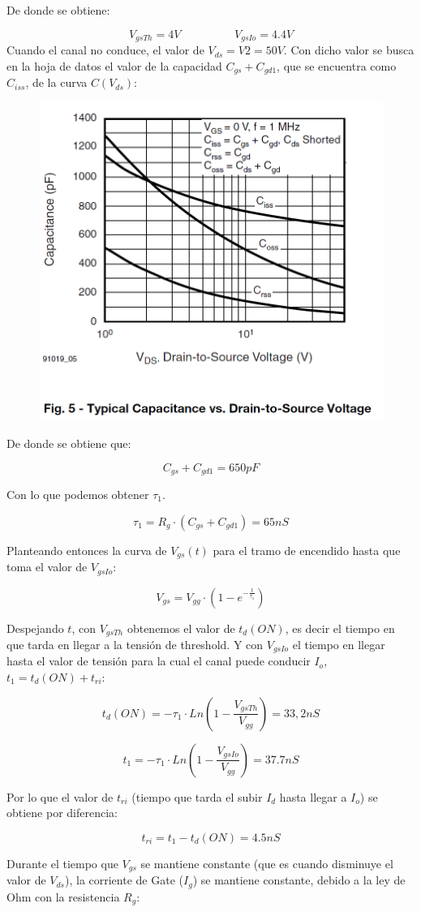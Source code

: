 \documentclass[e4_tp1_main.tex]{subfiles}
\begin{document}
De donde se obtiene:

\[
V_{gsTh} = 4V \hspace{2cm} V_{gsIo} = 4.4V
\]
\newpage
Cuando el canal no conduce, el valor de $V_{ds} = V2 = 50V$. Con dicho valor se busca en la hoja de datos el valor de la capacidad $C_{gs} + C_{gd1}$, que se encuentra como $C_{iss}$, de la curva $C(V_{ds})$:

\begin{figure}[H]
\centering
\includegraphics[width=0.5\linewidth]{Imagenes/Punto1/Ej1-Capacidades.png}
\end{figure}

De donde se obtiene que:

\[
C_{gs} + C_{gd1} = 650pF
\]

Con lo que podemos obtener $\tau_1$.

\[
\tau_1 = R_g \cdot (C_{gs} + C_{gd1}) = 65nS
\]

Planteando entonces la curva de $V_{gs}(t)$ para el tramo de encendido hasta que toma el valor de $V_{gsIo}$:

\[
V_{gs} = V_{gg} \cdot (1 - e^{-\frac{t}{\tau_1}})
\]

Despejando $t$, con $V_{gsTh}$ obtenemos el valor de $t_d(ON)$, es decir el tiempo en que tarda en llegar a la tensión de threshold. Y con $V_{gsIo}$ el tiempo en llegar hasta el valor de tensión para la cual el canal puede conducir $I_o$, $t_1 = t_d(ON) + t_{ri}$:

\[
t_d(ON) = -\tau_1 \cdot Ln\left( 1 - \frac{V_{gsTh}}{V_{gg}} \right) = 33,2nS
\]

\[
t_1 = -\tau_1 \cdot Ln\left( 1 - \frac{V_{gsIo}}{V_{gg}} \right) = 37.7nS
\]

Por lo que el valor de $t_{ri}$ (tiempo que tarda el subir $I_d$ hasta llegar a $I_o$) se obtiene por diferencia:

\[
t_{ri} = t_1 - t_d(ON)= 4.5nS
\]

Durante el tiempo que $V_{gs}$ se mantiene constante (que es cuando disminuye el valor de $V_{ds}$), la corriente de Gate ($I_g$) se mantiene constante, debido a la ley de Ohm con la resistencia $R_g$:
\end{document}
